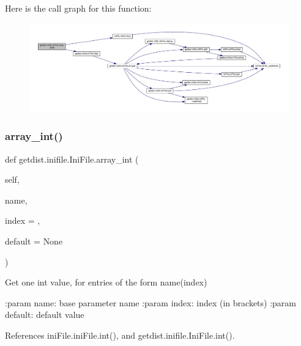 Here is the call graph for this function\+:
\nopagebreak
\begin{figure}[H]
\begin{center}
\leavevmode
\includegraphics[width=350pt]{classgetdist_1_1inifile_1_1IniFile_a6ffefc5aa732378e03adde8b83e88b96_cgraph}
\end{center}
\end{figure}
\mbox{\label{classgetdist_1_1inifile_1_1IniFile_a7a2d4f1f5cd18de58f68f53e5111baf3}} 
\subsubsection{\texorpdfstring{array\+\_\+int()}{array\_int()}}
{\footnotesize\ttfamily def getdist.\+inifile.\+Ini\+File.\+array\+\_\+int (\begin{DoxyParamCaption}\item[{}]{self,  }\item[{}]{name,  }\item[{}]{index = {},  }\item[{}]{default = {\ttfamily None} }\end{DoxyParamCaption})}

\begin{DoxyVerb}Get one int value, for entries of the form name(index)

:param name: base parameter name
:param index: index (in brackets)
:param default: default value
\end{DoxyVerb}
 

References ini\+File.\+ini\+File.\+int(), and getdist.\+inifile.\+Ini\+File.\+int().

